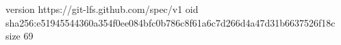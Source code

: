version https://git-lfs.github.com/spec/v1
oid sha256:e51945544360a354f0ee084bfc0b786c8f61a6c7d266d4a47d31b6637526f18c
size 69
